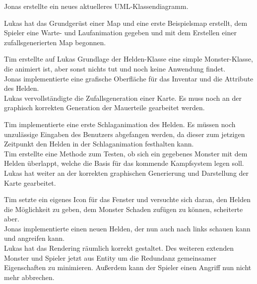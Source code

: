 
Jonas erstellte ein neues aktuelleres UML-Klassendiagramm.\\


Lukas hat das Grundgerüst einer Map und eine erste Beispielsmap erstellt, dem Spieler eine Warte- und Laufanimation gegeben und mit dem Erstellen einer zufallsgenerierten Map begonnen. \\


Tim erstellte auf Lukas Grundlage der Helden-Klasse eine simple Monster-Klasse, die animiert ist, aber sonst nichts tut und noch keine Anwendung findet. \\
Jonas implementierte eine grafische Oberfläche für das Inventar und die Attribute des Helden. \\
Lukas vervollständigte die Zufallsgeneration einer Karte. Es muss noch an der graphisch korrekten Generation der Mauerteile gearbeitet werden. \\


Tim implementierte eine erste Schlaganimation des Helden. Es müssen noch \glqq{}unzulässige Eingaben\grqq{} des Benutzers abgefangen werden, da dieser zum jetzigen Zeitpunkt den Helden in der Schlaganimation festhalten kann. \\
Tim erstellte eine Methode zum Testen, ob sich ein gegebenes Monster mit dem Helden überlappt, welche die Basis für das kommende Kampfsystem legen soll.\\
Lukas hat weiter an der korrekten graphischen Generierung und Darstellung der Karte gearbeitet. \\


Tim setzte ein eigenes Icon für das Fenster und versuchte sich daran, den Helden die Möglichkeit zu geben, dem Monster Schaden zufügen zu können, scheiterte aber. \\
Jonas implementierte einen neuen Helden, der nun auch nach links schauen kann und angreifen kann. \\
Lukas hat das Rendering räumlich korrekt gestaltet. Des weiteren extenden Monster und Spieler jetzt aus Entity um die Redundanz gemeinsamer Eigenschaften zu minimieren. Außerdem kann der Spieler einen Angriff nun nicht mehr abbrechen. \\


